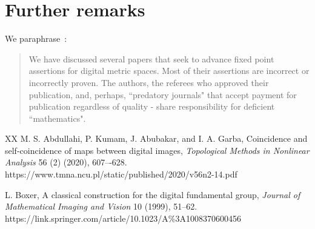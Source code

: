 \documentclass{article}
\numberwithin{thm}{section}
\begin{document}
\section{Further remarks}
We paraphrase~\cite{BxBad8}:
\begin{quote}
We have discussed several papers that seek to advance
fixed point assertions for digital metric spaces.
Most of their assertions are incorrect or incorrectly proven. 
The authors, the referees who
approved their publication, and, perhaps, 
``predatory journals"
that accept payment for publication regardless of quality - share responsibility for
deficient ``mathematics".
\end{quote}

\begin{thebibliography}{XX}
M. S. Abdullahi, P. Kumam, J. Abubakar, and I. A. Garba,
Coincidence and self-coincidence of maps between digital images,
{\em Topological Methods in Nonlinear 
Analysis}
56 (2) (2020), 607–-628.
\newline
https://www.tmna.ncu.pl/static/published/2020/v56n2-14.pdf

L. Boxer, A classical construction for the digital fundamental group, 
{\em Journal of Mathematical Imaging and Vision} 10 (1999),
51--62.
\newline
https://link.springer.com/article/10.1023/A$\%$3A1008370600456

\end{thebibliography}
\end{document}

